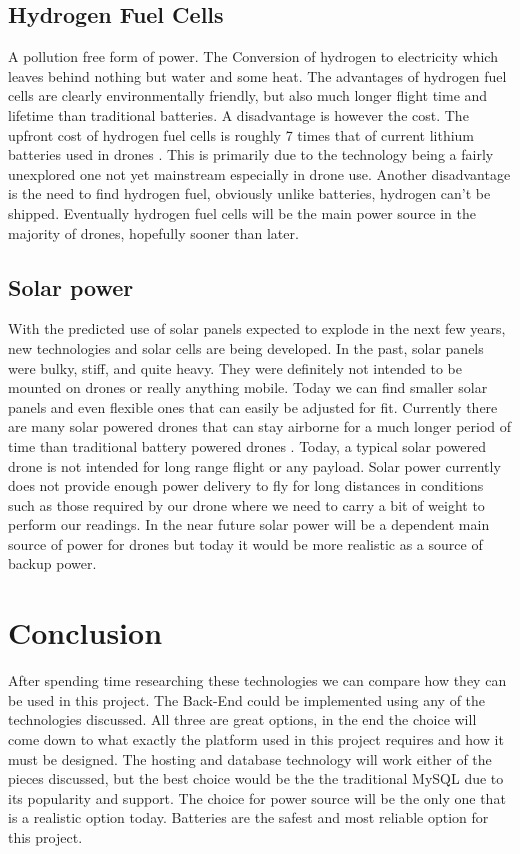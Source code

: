 \documentclass[onecolumn, draftclsnofoot,10pt, compsoc]{IEEEtran}
\begin{document}
    \subsection{Hydrogen Fuel Cells}
    A pollution free form of power. The Conversion of hydrogen to electricity which leaves
    behind nothing but water and some heat. The advantages of hydrogen fuel cells are
    clearly environmentally friendly, but also much longer flight time and lifetime than
    traditional batteries. A disadvantage is however the cost. The upfront cost of
    hydrogen fuel cells is roughly 7 times that of current lithium batteries used in
    drones \cite{HydrogenFuelCells}. This is primarily due to the technology being a fairly unexplored one not yet
    mainstream especially in drone use. Another disadvantage is the need to find hydrogen
    fuel, obviously unlike batteries, hydrogen can’t be shipped. Eventually hydrogen fuel
    cells will be the main power source in the majority of drones, hopefully sooner than
    later.

    \subsection{Solar power}
    With the predicted use of solar panels expected to explode in the next few years, new technologies and solar cells are
    being developed. In the past, solar panels were bulky, stiff, and quite heavy. They were definitely not intended to
    be mounted on drones or really anything mobile. Today we can find smaller solar panels and even flexible ones that can
    easily be adjusted for fit. Currently there are many solar powered drones that can stay airborne for a much longer period of
    time than traditional battery powered drones \cite{SolarPower}. Today, a typical solar powered drone is not intended for long range flight or any
    payload. Solar power currently does not provide enough power delivery to fly for long distances in conditions such as those
    required by our drone where we need to carry a bit of weight to perform our readings. In the near future solar power will
    be a dependent main source of power for drones but today it would be more realistic as a source of backup power.


\section{Conclusion}

    After spending time researching these technologies we can compare how they can be used in this project.
    The Back-End could be implemented using any of the technologies discussed. All three are great options,
    in the end the choice will come down to what exactly the platform used in this project requires and how it
    must be designed. The hosting and database technology will work either of the pieces discussed, but the best
    choice would be the the traditional MySQL due to its popularity and support. The choice for power source will
    be the only one that is a realistic option today. Batteries are the safest and most reliable option for this
    project.

\newpage


\end{document}
